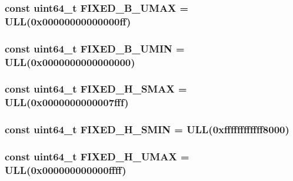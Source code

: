\label{namespaceMipsISA_a4e61092133665f4dee5dc4f839b9b3c0}
\hypertarget{namespaceMipsISA_ab35e34bc34906681016d591f07fa8388}{
\subsubsection[{FIXED\_\-B\_\-UMAX}]{\setlength{\rightskip}{0pt plus 5cm}const uint64\_\-t {\bf FIXED\_\-B\_\-UMAX} = ULL(0x00000000000000ff)}}
\label{namespaceMipsISA_ab35e34bc34906681016d591f07fa8388}
\hypertarget{namespaceMipsISA_a7982d3f6b301b728e3ce73462cc8bb9a}{
\subsubsection[{FIXED\_\-B\_\-UMIN}]{\setlength{\rightskip}{0pt plus 5cm}const uint64\_\-t {\bf FIXED\_\-B\_\-UMIN} = ULL(0x0000000000000000)}}
\label{namespaceMipsISA_a7982d3f6b301b728e3ce73462cc8bb9a}
\hypertarget{namespaceMipsISA_a9a903d88c7f897a8b6fd36c18e83f35d}{
\subsubsection[{FIXED\_\-H\_\-SMAX}]{\setlength{\rightskip}{0pt plus 5cm}const uint64\_\-t {\bf FIXED\_\-H\_\-SMAX} = ULL(0x0000000000007fff)}}
\label{namespaceMipsISA_a9a903d88c7f897a8b6fd36c18e83f35d}
\hypertarget{namespaceMipsISA_ae673d35643dfe81498cbf17a7e9cd587}{
\subsubsection[{FIXED\_\-H\_\-SMIN}]{\setlength{\rightskip}{0pt plus 5cm}const uint64\_\-t {\bf FIXED\_\-H\_\-SMIN} = ULL(0xffffffffffff8000)}}
\label{namespaceMipsISA_ae673d35643dfe81498cbf17a7e9cd587}
\hypertarget{namespaceMipsISA_a9fe6e8880110446df9f2b48464395dc8}{
\subsubsection[{FIXED\_\-H\_\-UMAX}]{\setlength{\rightskip}{0pt plus 5cm}const uint64\_\-t {\bf FIXED\_\-H\_\-UMAX} = ULL(0x000000000000ffff)}}

